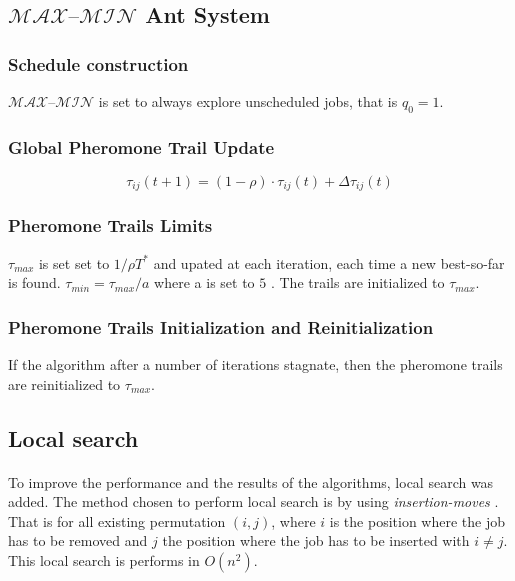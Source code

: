\documentclass[runningheads]{llncs}
\begin{document}
\subsection{$\mathcal{MAX – MIN}$ Ant System}


\subsubsection{Schedule construction}

$\mathcal{MAX – MIN}$ is set to always explore unscheduled jobs, that is $q_0 = 1$.


\subsubsection{Global Pheromone Trail Update}

\begin{equation}
\tau_{ij}(t+1) = (1 - \rho) \cdot \tau_{ij}(t) + \Delta \tau_{ij}(t)
\end{equation}

\subsubsection{Pheromone Trails Limits}

$\tau_{max}$ is set set to $1 / \rho T^*$ and upated at each iteration, each time a new
best-so-far is found.
$\tau_{min} = \tau_{max} / a$ where a is set to $5$ \cite{stutzle_ant_1997}. The trails are initialized to $\tau_{max}$.

\subsubsection{Pheromone Trails Initialization and Reinitialization}

If the algorithm after a number of iterations stagnate, then the
pheromone trails are reinitialized to $\tau_{max}$.

\subsection{Local search}

\label{localsearch}

\paragraph{}


To improve the performance and the results of the algorithms, local search was added. The method chosen to perform local search is by using \textit{insertion-moves} \cite{stutzle_ant_1997}. That is for all existing permutation $(i, j)$, where $i$ is the position where the job has to be removed and $j$ the position where the job has to be inserted with $i \neq j$. This local search is performs in $O(n^2)$.
\end{document}

